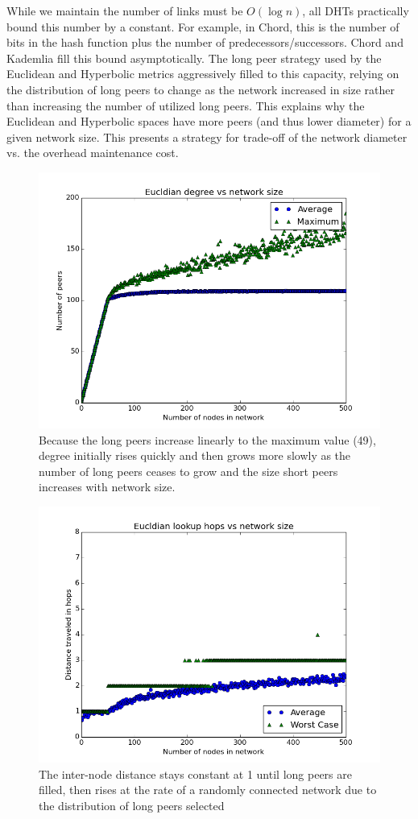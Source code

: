 \documentclass[11pt,conference]{IEEEtran}
\begin{document}
While we maintain the number of links must be $ O(\log n)$, all DHTs practically bound this number by a constant.  
For example, in Chord, this is the number of bits in the hash function plus the number of predecessors/successors.
Chord and Kademlia fill this bound asymptotically. 
The long peer strategy used by the Euclidean and Hyperbolic metrics aggressively filled to this capacity, relying on the distribution of long peers to change as the network increased in size rather than increasing the number of utilized long peers.
This explains why the Euclidean and Hyperbolic spaces have more peers (and thus lower diameter) for a given network size.
This presents a strategy for trade-off of the network diameter vs. the overhead maintenance cost.




\begin{figure}
\centering
\includegraphics[width=0.7\linewidth]{figs/EucldianDegree}
\caption{Because the long peers increase linearly to the maximum value (49), degree initially rises quickly and then grows  more slowly as the number of long peers ceases to grow and the size short peers increases with network size. }
\label{fig:EucldianDegree}
\end{figure}

\begin{figure}
\centering
\includegraphics[width=0.7\linewidth]{figs/EucldianDistance}
\caption{The inter-node distance stays constant at 1 until long peers are filled, then rises at the rate of a randomly connected network due to the distribution of long peers selected}
\label{fig:EucldianDistance}
\end{figure}
\end{document}
